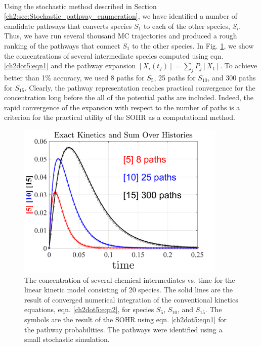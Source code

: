 \paragraph{}
Using the stochastic method described in Section \ref{ch2:sec:Stochastic_pathway_enumeration}, we have identified a number
of candidate pathways that converts species $S_1$ to each of the other species, $S_i$. Thus,
we have run several thousand MC trajectories and produced a rough ranking of the pathways that connect $S_1$ to the other species.
In Fig. \ref{ch2dot5:fig4}, we show the concentrations
of several intermediate species computed using eqn. \ref{ch2dot5:eqn1} and the pathway expansion $ \left[ X_i(t_f) \right] = \sum_{j}{P_j \left[ X_1 \right] }$. To achieve better than 1$\%$ accuracy, we used 8 paths for $S_5$, 25 paths for $S_{10}$, and 300 paths for $S_{15}$. Clearly, the pathway representation
reaches practical convergence for the concentration long before the all of the
potential paths are included. Indeed, the rapid convergence of the expansion with
respect to the number of paths is a criterion for the practical utility of the SOHR as a
computational method.
\begin{figure}[htbp]
	\caption[The concentration from SOHR vs. concentration from ODEs]{The concentration of several chemical intermediates vs. time for the linear kinetic
model consisting of 20 species. The solid lines are the result of converged numerical integration
of the conventional kinetics equations, eqn. \ref{ch2dot5:eqn2}, for species $S_5$, $S_{10}$, and $S_{15}$. The symbols
are the result of the SOHR using eqn. \ref{ch2dot5:eqn1} for the pathway probabilities. The pathways
were identified using a small stochastic simulation.}
    \begin{center}
	\includegraphics[width=100mm]{figs/chapter2dot5/fig4.png}
    \end{center}
\label{ch2dot5:fig4}
\end{figure}
